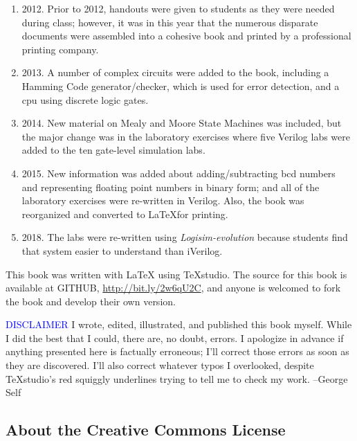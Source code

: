 \begin{enumerate}
  \item 2012. Prior to 2012, handouts were given to students as they were needed during class; however, it was in this year that the numerous disparate documents were assembled into a cohesive book and printed by a professional printing company.
  \item 2013. A number of complex circuits were added to the book, including a Hamming Code generator/checker, which is used for error detection, and a \gls{cpu} using discrete logic gates.
  \item 2014. New material on Mealy and Moore State Machines was included, but the major change was in the laboratory exercises where five Verilog labs were added to the ten gate-level simulation labs.
  \item 2015. New information was added about adding/subtracting \gls{bcd} numbers and representing floating point numbers in binary form; and all of the laboratory exercises were re-written in Verilog. Also, the book was reorganized and converted to \LaTeX for printing.
  \item 2018. The labs were re-written using \textit{Logisim-evolution} because students find that system easier to understand than iVerilog.
\end{enumerate}

This book was written with \LaTeX \: using TeXstudio. The source for this book is available at GITHUB, \url{http://bit.ly/2w6qU2C}, and anyone is welcomed to fork the book and develop their own version. 

\medskip

\begin{tcolorbox}[colback=blue!5!white,colframe=blue!75!black]
  \textcolor{blue}{DISCLAIMER}
  \tcblower
  \textsf{I wrote, edited, illustrated, and published this book myself. While I did the best that I could, there are, no doubt, errors. I apologize in advance if anything presented here is factually erroneous; I'll correct those errors as soon as they are discovered. I'll also correct whatever typos I overlooked, despite TeXstudio's red squiggly underlines trying to tell me to check my work. --George Self}
\end{tcolorbox}

\medskip

\subsection{About the Creative Commons License}

